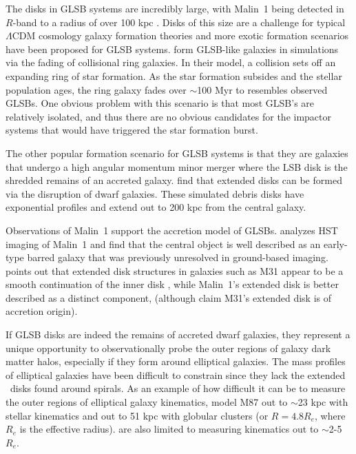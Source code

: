 \documentclass[12pt,preprint]{aastex}
\newcommand\HI{\ion{H}{1}}
\begin{document}
The disks in GLSB systems are incredibly large, with Malin~1 being detected in $R$-band to a radius of over 100 kpc \citep{Moore06}.
Disks of this size are a challenge for typical $\Lambda$CDM cosmology galaxy formation theories and more exotic formation scenarios have been proposed for GLSB systems.
\citet{Mapelli08} form GLSB-like galaxies in simulations via the fading of collisional ring galaxies.
In their model, a collision sets off an expanding ring of star formation.
As the star formation subsides and the stellar population ages, the ring galaxy fades over $\sim$100 Myr to resembles observed GLSBs.
One obvious problem with this scenario is that most GLSB's are relatively isolated, and thus there are no obvious candidates for the impactor systems that would have triggered the star formation burst.


The other popular formation scenario for GLSB systems is that they are galaxies that undergo a high angular momentum minor merger where the LSB disk is the shredded remains of an accreted galaxy.
\citet{Pen06} find that extended disks can be formed via the disruption of dwarf galaxies.
These simulated debris disks have exponential profiles and extend out to 200 kpc from the central galaxy.

Observations of Malin~1 support the accretion model of GLSBs.
\citet{Barth07} analyzes HST imaging of Malin~1 and find that the central object is well described as an early-type barred galaxy that was previously unresolved in ground-based imaging. \citet{Barth07} points out that extended disk structures in galaxies such as M31 appear to be a smooth continuation of the inner disk \citep{Ferguson02}, while Malin~1's extended disk is better described as a distinct component, (although \citet{Ibata05} claim M31's extended disk is of accretion origin).


If GLSB disks are indeed the remains of accreted dwarf galaxies, they represent a unique opportunity to observationally probe the outer regions of galaxy dark matter halos, especially if they form around elliptical galaxies.
The mass profiles of elliptical galaxies have been difficult to constrain since they lack the extended \HI\ disks found around spirals.
As an example of how difficult it can be to measure the outer regions of elliptical galaxy kinematics, \citet{Murphy2011} model M87 out to $\sim$23 kpc with stellar kinematics and out to 51 kpc with globular clusters (or $R=4.8 R_e$, where $R_e$ is the effective radius). \citet{Raskutti14} are also limited to measuring kinematics out to $\sim$2-5 $R_e$.
\end{document}
